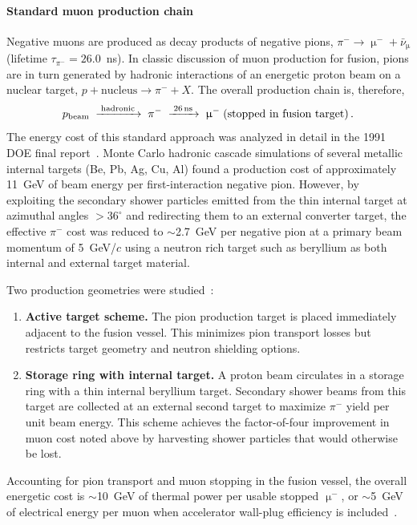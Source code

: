 \documentclass[particles,article,accept,pdftex,moreauthors]{Definitions/mdpi}
\begin{document}
\paragraph*{\bf Standard muon production chain}
Negative muons are produced as decay products of negative pions, $\pi^-\to\upmu^-+\bar\nu_\upmu$ (lifetime $\tau_{\pi^-}=26.0$~ns). In classic discussion of muon production for fusion, pions are in turn generated by hadronic interactions of an energetic proton beam on a nuclear target, $p+\mathrm{nucleus}\to \pi^-+X$. The overall production chain is, therefore,
\begin{equation}
p_{\rm beam}\;\xrightarrow{\;\rm hadronic\;}\;\pi^-\;\xrightarrow{\;26\,\mathrm{ns}\;}\;\upmu^-\;(\text{stopped in fusion target})\,.
\end{equation}
The energy cost of this standard approach was analyzed in detail in the 1991 DOE final report~\cite{Rafelski:1991DOE}. Monte Carlo hadronic cascade simulations of several metallic internal targets (Be, Pb, Ag, Cu, Al) found a production cost of approximately 11~GeV of beam energy per first-interaction negative pion. However, by exploiting the secondary shower particles emitted from the thin internal target at azimuthal angles $>36^\circ$ and redirecting them to an external converter target, the effective $\pi^-$ cost was reduced to $\sim$2.7~GeV per negative pion at a primary beam momentum of 5~GeV/$c$ using a neutron rich target such as beryllium as both internal and external target material.

Two production geometries were studied~\cite{Rafelski:1991DOE}:
\begin{enumerate}
\item[(1)] \textbf{Active target scheme.} The pion production target is placed immediately adjacent to the fusion vessel. This minimizes pion transport losses but restricts target geometry and neutron shielding options.
\item[(2)] \textbf{Storage ring with internal target.} A proton beam circulates in a storage ring with a thin internal beryllium target. Secondary shower beams from this target are collected at an external second target to maximize $\pi^-$ yield per unit beam energy. This scheme
achieves the factor-of-four improvement in muon cost noted above by harvesting shower particles that would otherwise be lost.
\end{enumerate}

Accounting for pion transport and muon stopping in the fusion vessel, the overall energetic cost is $\sim$10~GeV of thermal power per usable stopped $\upmu^-$, or $\sim$5~GeV of electrical energy per muon when accelerator wall-plug efficiency is included~\cite{Rafelski:1990in,Rafelski:1991DOE}.
\end{document}
